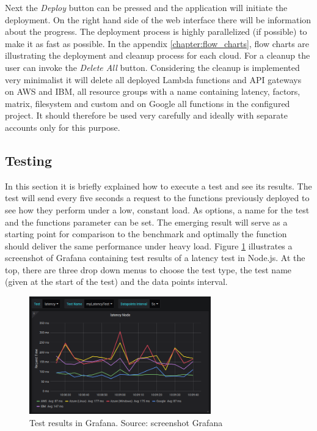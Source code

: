 Next the \textit{Deploy} button can be pressed and the application will initiate the deployment. On the right hand side of the web interface there will be information about the progress. The deployment process is highly parallelized (if possible) to make it as fast as possible. In the appendix \ref{chapter:flow_charts}, flow charts are illustrating the deployment and cleanup process for each cloud. For a cleanup the user can invoke the \textit{Delete All} button. Considering the cleanup is implemented very minimalist it will delete all deployed Lambda functions and \gls{API} gateways on \gls{AWS} and IBM, all resource groups with a name containing latency, factors, matrix, filesystem and custom and on Google all functions in the configured project. It should therefore be used very carefully and ideally with separate accounts only for this purpose.

\subsection{Testing}
In this section it is briefly explained how to execute a test and see its results. The test will send every five seconds a request to the functions previously deployed to see how they perform under a low, constant load. As options, a name for the test and the functions parameter can be set. The emerging result will serve as a starting point for comparison to the benchmark and optimally the function should deliver the same performance under heavy load. Figure \ref{fig:grafana} illustrates a screenshot of Grafana containing test results of a latency test in Node.js. At the top, there are three drop down menus to choose the test type, the test name (given at the start of the test) and the data points interval.

\begin{figure}[htp]
\begin{center}
\includegraphics[width=0.7\textwidth]{bilder/grafana.png}
\captionsetup{justification=centering, labelfont=bf}
\caption[Test results in Grafana]{Test results in Grafana. Source: screenshot Grafana}
\label{fig:grafana}
\end{center}
\end{figure}

